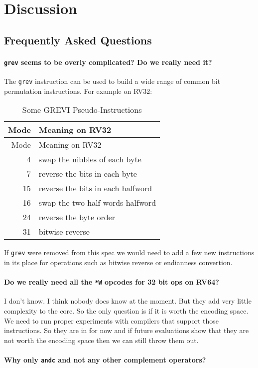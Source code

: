 \chapter{Discussion}

\section{Frequently Asked Questions}

\subsubsection{\texttt{grev} seems to be overly complicated? Do we really need it?}

The \texttt{grev} instruction can be used to build a wide range of common
bit permutation instructions. For example on RV32:

\begin{longtable}[c]{@{}rl@{}}
\caption{Some GREVI Pseudo-Instructions}\tabularnewline
\toprule
Mode & Meaning on RV32\tabularnewline
\midrule
\endfirsthead
\toprule
Mode & Meaning on RV32\tabularnewline
\midrule
\endhead
4 & swap the nibbles of each byte\tabularnewline
7 & reverse the bits in each byte\tabularnewline
15 & reverse the bits in each halfword\tabularnewline
16 & swap the two half words halfword\tabularnewline
24 & reverse the byte order\tabularnewline
31 & bitwise reverse\tabularnewline
\bottomrule
\end{longtable}

If \texttt{grev} were removed from this spec we would need to add a few new
instructions in its place for operations such as bitwise reverse or
endianness convertion.

\subsubsection{Do we really need all the \texttt{*W} opcodes for 32 bit ops on RV64?}

I don't know. I think nobody does know at the moment. But they add very little
complexity to the core. So the only question is if it is worth the encoding
space. We need to run proper experiments with compilers that support those
instructions. So they are in for now and if future evaluations show that they
are not worth the encoding space then we can still throw them out.

\subsubsection{Why only \texttt{andc} and not any other complement operators?}

